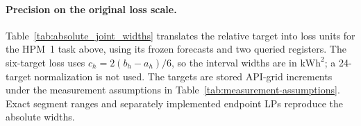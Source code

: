 \paragraph{Precision on the original loss scale.}
Table~\ref{tab:absolute_joint_widths} translates the relative target into
loss units for the HPM~1 task above, using its frozen forecasts and two queried
registers. The six-target loss uses $c_h=2(b_h-a_h)/6$, so the interval widths
are in $\mathrm{kWh}^2$; a 24-target normalization is not used. The targets
are stored API-grid increments under the measurement assumptions in
Table~\ref{tab:measurement-assumptions}. Exact segment ranges and separately
implemented endpoint LPs reproduce the absolute widths.
